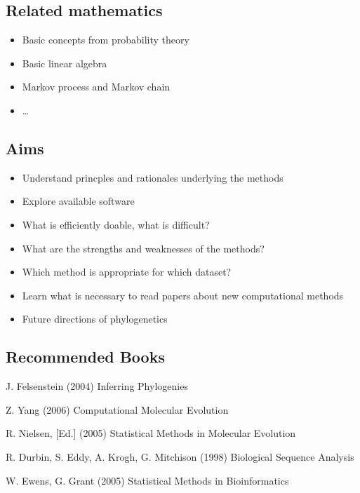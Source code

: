 \documentclass[12pt]{book}
\begin{document}
    \subsection{Related mathematics}
        \begin{itemize}
            \item Basic concepts from probability theory
            \item Basic linear algebra
            \item Markov process and Markov chain
            \item \dots
        \end{itemize}
    
    \subsection{Aims}
        \begin{itemize}
            \item Understand princples and rationales underlying the methods
            \item Explore available software
            \item What is efficiently doable, what is difficult?
            \item What are the strengths and weaknesses of the methods?
            \item Which method is appropriate for which dataset?
            \item Learn what is necessary to read papers about new computational methods
            \item Future directions of phylogenetics
        \end{itemize}

    \subsection{Recommended Books}\hfill
        
        J. Felsenstein (2004) Inferring Phylogenies
        
        Z. Yang (2006) Computational Molecular Evolution
        
        R. Nielsen, [Ed.] (2005) Statistical Methods in Molecular Evolution
        
        R. Durbin, S. Eddy, A. Krogh, G. Mitchison (1998) Biological Sequence Analysis
        
        W. Ewens, G. Grant (2005) Statistical Methods in Bioinformatics

\ifx\allfiles\undefined
\end{document}
